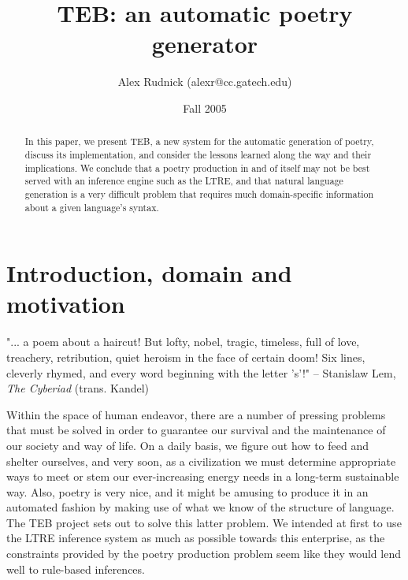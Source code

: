 \documentclass[12pt]{article}
\title{TEB: an automatic poetry generator}
\author{Alex Rudnick (alexr@cc.gatech.edu)}
\date{Fall 2005}
\begin{document}
\maketitle

\begin{abstract}
In this paper, we present TEB, a new system for the automatic generation of
poetry, discuss its implementation, and consider the lessons learned along
the way and their implications. We conclude that a poetry production in and
of itself may not be best served with an inference engine such as the LTRE,
and that natural language generation is a very difficult problem that
requires much domain-specific information about a given language's syntax.
\end{abstract}

\section{Introduction, domain and motivation}
"...  a poem about a haircut! But lofty, nobel, tragic, timeless, full of
love, treachery, retribution, quiet heroism in the face of certain doom!
Six lines, cleverly rhymed, and every word beginning with the letter 's'!"
\newline-- Stanislaw Lem, \emph{The Cyberiad} (trans. Kandel)

\bigskip
Within the space of human endeavor, there are a number of pressing problems
that must be solved in order to guarantee our survival and the maintenance
of our society and way of life. On a daily basis, we figure out how to feed
and shelter ourselves, and very soon, as a civilization we must determine
appropriate ways to meet or stem our ever-increasing energy needs in a
long-term sustainable way. Also, poetry is very nice, and it might be
amusing to produce it in an automated fashion by making use of what we know
of the structure of language. The TEB project sets out to solve this latter
problem. We intended at first to use the LTRE inference system as much as
possible towards this enterprise, as the constraints provided by the poetry
production problem seem like they would lend well to rule-based inferences.
\end{document}
